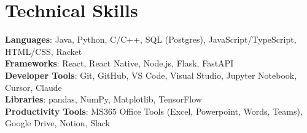\documentclass[letterpaper,11pt]{article}
\begin{document}
%
\section{Technical Skills}
 \begin{itemize}[leftmargin=0.15in, label={}]
    \small{\item{
     \textbf{Languages}{: Java, Python, C/C++, SQL (Postgres), JavaScript/TypeScript, HTML/CSS, Racket} \\
     \textbf{Frameworks}{: React, React Native, Node.js, Flask, FastAPI} \\
     \textbf{Developer Tools}{: Git, GitHub, VS Code, Visual Studio, Jupyter Notebook, Cursor, Claude} \\
     \textbf{Libraries}{: pandas, NumPy, Matplotlib, TensorFlow}\\
     \textbf{Productivity Tools}{: MS365 Office Tools (Excel, Powerpoint, Words, Teams), Google Drive, Notion, Slack}
    }}
 \end{itemize}


\end{document}
